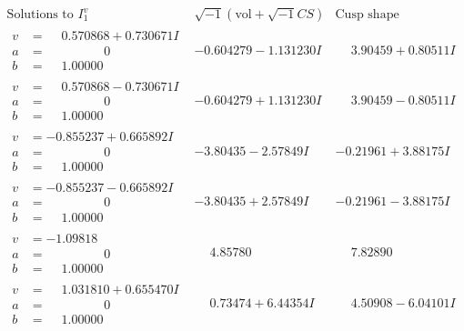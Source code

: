 \documentclass[1p]{elsarticle_modified}
\theoremstyle{definition}
\newcommand{\I}{\sqrt{-1}}
\begin{document}
$$\begin{array}{c|c|c}  
\text{Solutions to }I^v_{1}& \I (\text{vol} + \sqrt{-1}CS) & \text{Cusp shape}\\
 \hline 
\begin{aligned}
v &= \phantom{-}0.570868 + 0.730671 I \\
a &= \phantom{-0.000000 } 0 \\
b &= \phantom{-}1.00000\phantom{ +0.000000I}\end{aligned}
 & -0.604279 - 1.131230 I & \phantom{-}3.90459 + 0.80511 I \\ \hline\begin{aligned}
v &= \phantom{-}0.570868 - 0.730671 I \\
a &= \phantom{-0.000000 } 0 \\
b &= \phantom{-}1.00000\phantom{ +0.000000I}\end{aligned}
 & -0.604279 + 1.131230 I & \phantom{-}3.90459 - 0.80511 I \\ \hline\begin{aligned}
v &= -0.855237 + 0.665892 I \\
a &= \phantom{-0.000000 } 0 \\
b &= \phantom{-}1.00000\phantom{ +0.000000I}\end{aligned}
 & -3.80435 - 2.57849 I & -0.21961 + 3.88175 I \\ \hline\begin{aligned}
v &= -0.855237 - 0.665892 I \\
a &= \phantom{-0.000000 } 0 \\
b &= \phantom{-}1.00000\phantom{ +0.000000I}\end{aligned}
 & -3.80435 + 2.57849 I & -0.21961 - 3.88175 I \\ \hline\begin{aligned}
v &= -1.09818\phantom{ +0.000000I} \\
a &= \phantom{-0.000000 } 0 \\
b &= \phantom{-}1.00000\phantom{ +0.000000I}\end{aligned}
 & \phantom{-}4.85780\phantom{ +0.000000I} & \phantom{-}7.82890\phantom{ +0.000000I} \\ \hline\begin{aligned}
v &= \phantom{-}1.031810 + 0.655470 I \\
a &= \phantom{-0.000000 } 0 \\
b &= \phantom{-}1.00000\phantom{ +0.000000I}\end{aligned}
 & \phantom{-}0.73474 + 6.44354 I & \phantom{-}4.50908 - 6.04101 I \\ \hline\begin{aligned}

\end{aligned}
\end{array}$$
\end{document}
